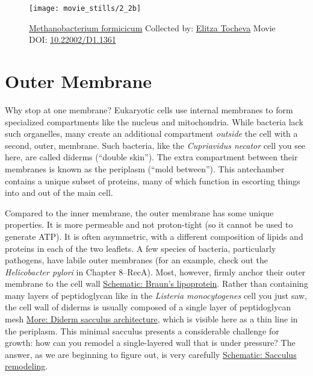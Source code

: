 \documentclass[]{tufte-book}
\begin{document}
\begin{figure}
\texttt{[image: movie\_stills/2\_2b]} \caption[\protect\hyperlink{tree}{Methanobacterium formicicum}
Collected by: \protect\hyperlink{elitza_tocheva}{Elitza Tocheva} Movie
DOI: \href{https://doi.org/10.22002/D1.1361}{10.22002/D1.1361}]{\protect\hyperlink{tree}{Methanobacterium formicicum}
Collected by: \protect\hyperlink{elitza_tocheva}{Elitza Tocheva} Movie
DOI: \href{https://doi.org/10.22002/D1.1361}{10.22002/D1.1361}}\label{fig:2-2b}
\end{figure}

\section{Outer Membrane}\label{outer-membrane}

Why stop at one membrane? Eukaryotic cells use internal membranes to
form specialized compartments like the nucleus and mitochondria. While
bacteria lack such organelles, many create an additional compartment
\emph{outside} the cell with a second, outer, membrane. Such bacteria,
like the \emph{Cupriavidus necator} cell you see here, are called
diderms (``double skin''). The extra compartment between their membranes
is known as the periplasm (``mold between''). This antechamber contains
a unique subset of proteins, many of which function in escorting things
into and out of the main cell.

Compared to the inner membrane, the outer membrane has some unique
properties. It is more permeable and not proton-tight (so it cannot be
used to generate ATP). It is often asymmetric, with a different
composition of lipids and proteins in each of the two leaflets. A few
species of bacteria, particularly pathogens, have labile outer membranes
(for an example, check out the \emph{Helicobacter pylori} in Chapter
8--RecA). Most, however, firmly anchor their outer membrane to the cell
wall \protect\hyperlink{Brauns_lipoprotein}{Schematic: Braun's
lipoprotein}. Rather than containing many layers of peptidoglycan like
in the \emph{Listeria monocytogenes} cell you just saw, the cell wall of
diderms is usually composed of a single layer of peptidoglycan mesh
\protect\hyperlink{Diderm_sacculus_architecture}{More: Diderm sacculus
architecture}, which is visible here as a thin line in the periplasm.
This minimal sacculus presents a considerable challenge for growth: how
can you remodel a single-layered wall that is under pressure? The
answer, as we are beginning to figure out, is very carefully
\protect\hyperlink{Sacculus_remodeling}{Schematic: Sacculus remodeling}.
\end{document}
